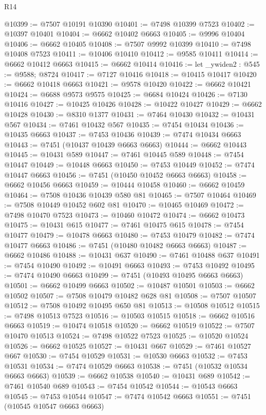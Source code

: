 \begin{lexlean}{R14}
\begin{coremodule}
@10399 := @7507 @10191 @10390
@10401 := @7498 @10399 @7523
@10402 := @10397 @10401
@10404 := @6662 @10402 @6663
@10405 := @9996 @10404
@10406 := @6662 @10405
@10408 := @7507 @9992 @10399
@10410 := @7498 @10408 @7523
@10411 := @10406 @10410
@10412 := @9585 @10411
@10414 := @6662 @10412 @6663
@10415 := @6662 @10414
@10416 := let _ywiden2 : @545 := @9588; @8724
@10417 := @7127 @10416
@10418 := @10415 @10417
@10420 := @6662 @10418 @6663
@10421 := @9578 @10420
@10422 := @6662 @10421
@10424 := @6688 @9573 @9575
@10425 := @6684 @10424
@10426 := @7130 @10416
@10427 := @10425 @10426
@10428 := @10422 @10427
@10429 := @6662 @10428
@10430 := @8310 @1377
@10431 := @7464 @10430
@10432 := @10431 @567
@10434 := @7461 @10432 @567
@10435 := @7454 @10434
@10436 := @10435 @6663
@10437 := @7453 @10436
@10439 := @7474 @10434 @6663
@10443 := @7451 (@10437 @10439 @6663 @6663)
@10444 := @6662 @10443
@10445 := @10431 @589
@10447 := @7461 @10445 @589
@10448 := @7454 @10447
@10449 := @10448 @6663
@10450 := @7453 @10449
@10452 := @7474 @10447 @6663
@10456 := @7451 (@10450 @10452 @6663 @6663)
@10458 := @6662 @10456 @6663
@10459 := @10444 @10458
@10460 := @6662 @10459
@10464 := @7508 @10436 @10439 @580 @81
@10465 := @7507 @10464
@10469 := @7508 @10449 @10452 @602 @81
@10470 := @10465 @10469
@10472 := @7498 @10470 @7523
@10473 := @10460 @10472
@10474 := @6662 @10473
@10475 := @10431 @615
@10477 := @7461 @10475 @615
@10478 := @7454 @10477
@10479 := @10478 @6663
@10480 := @7453 @10479
@10482 := @7474 @10477 @6663
@10486 := @7451 (@10480 @10482 @6663 @6663)
@10487 := @6662 @10486
@10488 := @10431 @637
@10490 := @7461 @10488 @637
@10491 := @7454 @10490
@10492 := @10491 @6663
@10493 := @7453 @10492
@10495 := @7474 @10490 @6663
@10499 := @7451 (@10493 @10495 @6663 @6663)
@10501 := @6662 @10499 @6663
@10502 := @10487 @10501
@10503 := @6662 @10502
@10507 := @7508 @10479 @10482 @628 @81
@10508 := @7507 @10507
@10512 := @7508 @10492 @10495 @650 @81
@10513 := @10508 @10512
@10515 := @7498 @10513 @7523
@10516 := @10503 @10515
@10518 := @6662 @10516 @6663
@10519 := @10474 @10518
@10520 := @6662 @10519
@10522 := @7507 @10470 @10513
@10524 := @7498 @10522 @7523
@10525 := @10520 @10524
@10526 := @6662 @10525
@10527 := @10431 @667
@10529 := @7461 @10527 @667
@10530 := @7454 @10529
@10531 := @10530 @6663
@10532 := @7453 @10531
@10534 := @7474 @10529 @6663
@10538 := @7451 (@10532 @10534 @6663 @6663)
@10539 := @6662 @10538
@10540 := @10431 @689
@10542 := @7461 @10540 @689
@10543 := @7454 @10542
@10544 := @10543 @6663
@10545 := @7453 @10544
@10547 := @7474 @10542 @6663
@10551 := @7451 (@10545 @10547 @6663 @6663)

\end{coremodule}
\end{lexlean}
